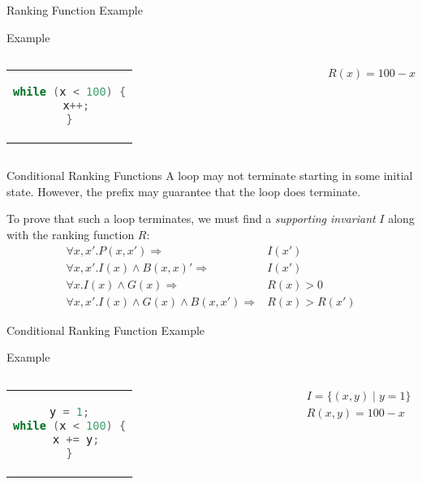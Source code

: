 \documentclass[xcolor=pdftex,t,11pt]{beamer}
\begin{document}
\begin{frame}[fragile]{Ranking Function Example}
\begin{exampleblock}{Example}
\begin{center}
\begin{columns}[c]
  \begin{tabular}{c}
   \begin{lstlisting}[language=c,basicstyle=\normalsize]
while (x < 100) {
  x++;
}
   \end{lstlisting}
  \end{tabular}
 $R(x) = 100 - x$
\end{columns}
\end{center}
\end{exampleblock}

\end{frame}


\begin{frame}[fragile]{Conditional Ranking Functions}
 A loop may not terminate starting in some initial state.  However, the prefix may guarantee
 that the loop does terminate.

 To prove that such a loop terminates, we must find a \emph{supporting invariant} $I$ along with the
 ranking function $R$:
 \begin{align*}
  \forall x, x' . P(x, x') \Rightarrow & I(x') \\
  \forall x, x' . I(x) \wedge B(x, x)' \Rightarrow & I(x') \\
  \forall x . I(x) \wedge G(x) \Rightarrow & R(x) > 0 \\
  \forall x, x' . I(x) \wedge G(x) \wedge B(x, x') \Rightarrow & R(x) > R(x')
 \end{align*}
\end{frame}

\begin{frame}[fragile]{Conditional Ranking Function Example}
\begin{exampleblock}{Example}
\begin{center}
\begin{columns}[T]
  \begin{tabular}{c}
   \begin{lstlisting}[language=c,basicstyle=\normalsize]
y = 1;
while (x < 100) {
  x += y;
}
   \end{lstlisting}
  \end{tabular}
\begin{gather*}
  I =  \{ (x, y) \mid y = 1 \} \\
  R(x, y) =  100 - x
\end{gather*}
\end{columns}
\end{center}
\end{exampleblock}
\end{frame}
\end{document}
